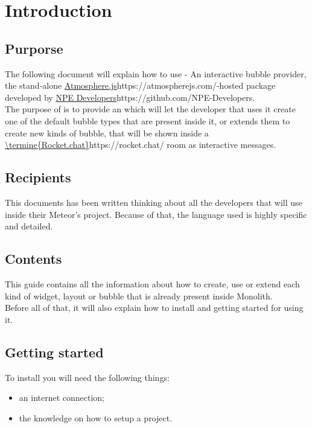 \section{Introduction}
\subsection{Purporse}
The following document will explain how to use  - An interactive bubble provider, the stand-alone \url{Atmosphere.js}{https://atmospherejs.com/}-hosted package developed by \url{NPE Developers}{https://github.com/NPE-Developers}. \\

The purpose of  is to provide an  which will let the developer that uses it create one of the default bubble types that are present inside it, or extends them to create new kinds of bubble, that will be shown inside a \url{\termine{Rocket.chat}}{https://rocket.chat/} room as interactive messages.

\subsection{Recipients}
This documents has been written thinking about all the developers that will use  inside their Meteor's project. Because of that, the language used is highly specific and detailed.

\subsection{Contents}
This guide contains all the information about how to create, use or extend each kind of widget, layout or bubble that is already present inside Monolith. \\
Before all of that, it will also explain how to install  and getting started for using it.

\subsection{Getting started}
To install  you will need the following things:
\begin{itemize}
	\item an internet connection;
	\item the knowledge on how to setup a  project.
\end{itemize}

